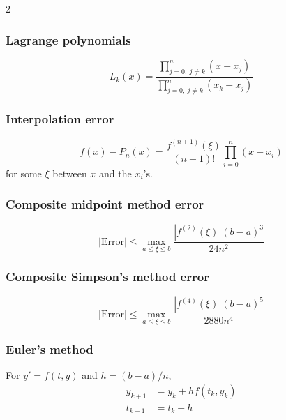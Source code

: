 \documentclass[10pt]{exam}
\begin{document}
\begin{multicols}{2}
\subsubsection*{Lagrange polynomials}

$$L_k(x) = \frac{\prod_{j = 0, ~ j \ne k}^n (x - x_j)}{\prod_{ j = 0, ~ j \ne k}^n (x_k - x_j)}$$

\subsubsection*{Interpolation error}

$$f(x) - P_n(x) = \frac{f^{(n+1)}(\xi)}{(n+1)!} \prod_{i = 0}^n (x-x_i)$$
for some $\xi$ between $x$ and the $x_i$'s. 

\subsubsection*{Composite midpoint method error}
$$|\text{Error}| \le \max_{a \le \xi \le b} \frac{|f^{(2)}(\xi)| (b - a)^3}{24 n^2}$$

\subsubsection*{Composite Simpson's method error}
$$|\text{Error}| \le \max_{a \le \xi \le b} \frac{|f^{(4)}(\xi)| (b - a)^5}{2880 n^4}$$

\subsubsection*{Euler's method}
For $y' = f(t, y)$ and $h = (b-a) / n$, 
\begin{align*}
y_{k+1} &= y_k + hf(t_k , y_k) \\
t_{k+1} &= t_k + h
\end{align*}

\end{multicols}
\end{document}
